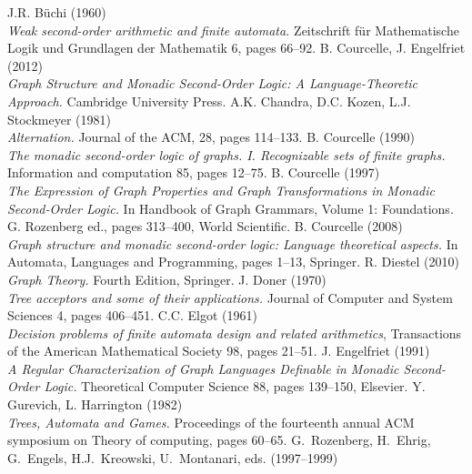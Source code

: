 \documentclass[a4paper,11pt,twoside]{report} \pdfoutput=1
\begin{document}
\begin{thebibliography}{9}
  J.R. Büchi (1960) \\
  \emph{Weak second-order arithmetic and finite automata.} Zeitschrift
  für Mathematische Logik und Grundlagen der Mathematik 6, pages
  66--92.
  B. Courcelle, J. Engelfriet (2012) \\
  \emph{Graph Structure and Monadic Second-Order Logic: A
    Language-Theoretic Approach.} Cambridge University Press.
  A.K. Chandra, D.C. Kozen, L.J. Stockmeyer (1981) \\
  \emph{Alternation.} Journal of the ACM, 28, pages 114--133.
  B. Courcelle (1990) \\
  \emph{The monadic second-order logic of graphs. I. Recognizable sets
    of finite graphs.} Information and computation 85, pages 12--75.
  B. Courcelle (1997) \\
  \emph{The Expression of Graph Properties and Graph Transformations
    in Monadic Second-Order Logic.} In Handbook of Graph Grammars,
  Volume 1: Foundations. G. Rozenberg ed., pages 313--400, World
  Scientific.
  B. Courcelle (2008) \\
  \emph{Graph structure and monadic second-order logic: Language
    theoretical aspects.} In Automata, Languages and Programming,
  pages 1--13, Springer.
  R. Diestel (2010) \\
  \emph{Graph Theory.} Fourth Edition, Springer.
  J. Doner (1970) \\
  \emph{Tree acceptors and some of their applications.} Journal of
  Computer and System Sciences 4, pages 406--451.
  C.C. Elgot (1961) \\
  \emph{Decision problems of finite automata design and related
    arithmetics}, Transactions of the American Mathematical Society
  98, pages 21--51.
  J. Engelfriet (1991) \\
  \emph{A Regular Characterization of Graph Languages Definable in
    Monadic Second-Order Logic.} Theoretical Computer Science 88,
  pages 139--150, Elsevier.
  Y. Gurevich, L. Harrington (1982) \\
  \emph{Trees, Automata and Games.} Proceedings of the fourteenth
  annual ACM symposium on Theory of computing, pages 60--65.
  G.~Rozenberg, H.~Ehrig, G.~Engels, H.J.~Kreowski, U.~Montanari, eds. (1997--1999) \\

\end{thebibliography}
\end{document}
